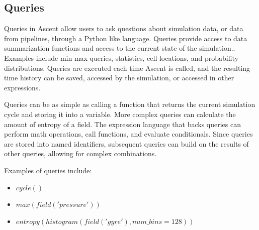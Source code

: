 \subsection{Queries}
\label{action_queries}
Queries in Ascent allow users to ask questions about simulation data,
or data from pipelines, through a Python like language.
%
Queries provide access to data summarization functions and access to the
current state of the simulation..
%
Examples include min-max queries, statistics, cell locations,
and probability distributions.
%
Queries are executed each time Ascent is called, and the resulting time
history can be saved, accessed by the simulation, or accessed in other
expressions.

Queries can be as simple as calling a function that returns the current simulation cycle
and storing it into a variable.
%
More complex queries can calculate the amount of entropy of a field.
%
The expression language that backs queries can perform math operations,
call functions, and evaluate conditionals.
%
Since queries are stored into named identifiers, subsequent queries
can build on the results of other queries, allowing for complex combinations.

Examples of queries include:
\begin{itemize}
\item $cycle()$
\item $max(field('pressure'))$
\item $entropy(histogram(field('gyre'), num\_bins=128))$
\end{itemize}
%

%
%

